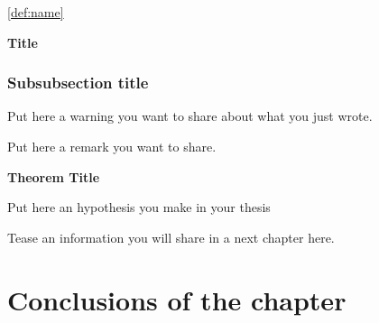 \noindent
\lipsum[2] \ref{def:name}

\begin{eve}
    \lipsum[3]
\end{eve}


\begin{Algorithm}{\textbf{Title}}

    \label{alg:algorithm_name}
 
    \begin{quote}
        \lipsum[4-6]
    \end{quote}

\end{Algorithm}

\subsubsection{Subsubsection title}

\label{sec:subsubsection_name}
\lipsum[10-11]

\begin{warning}
    Put here a warning you want to share about what you just wrote.
\end{warning}

\begin{idea}
   Put here a remark you want to share.
\end{idea}


\begin{theorem}{\textbf{Theorem Title}}
    \label{th:theorem_name}
    \lipsum[7-8]
\end{theorem}


\begin{hypo}
    Put here an hypothesis you make in your thesis
\end{hypo}


\begin{wait}
    Tease an information you will share in a next chapter here.
\end{wait}


\section{Conclusions of the chapter}

\lipsum[1-3]


\thispagestyle{fancy} %
